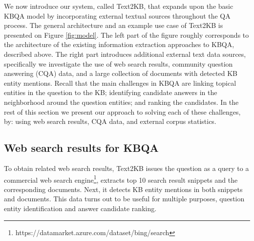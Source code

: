 We now introduce our system, called Text2KB, that expands upon the basic KBQA model by incorporating external textual sources throughout the QA process. The general architecture and an example use case of Text2KB is presented on Figure \ref{fig:model}. 
The left part of the figure roughly corresponds to the architecture of the existing information extraction approaches to KBQA, described above.
The right part introduces additional external text data sources, specifically
we investigate the use of web search results, community question answering (CQA) data, and a large collection of documents with detected KB entity mentions.
Recall that the main challenges in KBQA are linking topical entities in the question to the KB; identifying candidate answers in the neighborhood around the question entities; and ranking the candidates. In the rest of this section we present our approach to solving each of these challenges, by: using web search results, CQA data, and external corpus statistics. 


\subsection{Web search results for KBQA}
\label{section:method:web}

To obtain related web search results, Text2KB issues the question as a query to a commercial web search engine\footnote{https://datamarket.azure.com/dataset/bing/search}, extracts top 10 search result snippets and the corresponding documents.
Next, it detects KB entity mentions in both snippets and documents.
This data turns out to be useful for multiple purposes, \ie question entity identification and answer candidate ranking.

